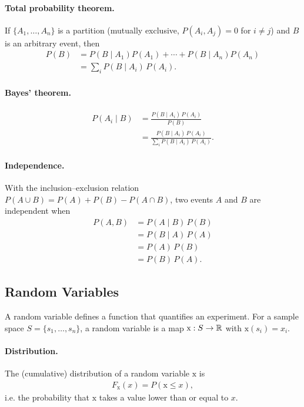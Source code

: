 \paragraph{Total probability theorem.}
If $\{A_1,\dots,A_n\}$ is a partition (mutually exclusive, $P(A_i,A_j)=0$ for $i\neq j$) and $B$ is an arbitrary event, then
\begin{align}
P(B) &= P(B\mid A_1)P(A_1) + \cdots + P(B\mid A_n)P(A_n) \\
&= \sum_{i} P(B\mid A_i)\,P(A_i).
\end{align}

\paragraph{Bayes' theorem.}
\begin{align}
P(A_i\mid B) &= \frac{P(B\mid A_i)\,P(A_i)}{P(B)} \\
&= \frac{P(B\mid A_i)\,P(A_i)}{\sum_{i} P(B\mid A_i)\,P(A_i)}.
\end{align}

\paragraph{Independence.}
With the inclusion--exclusion relation $P(A\cup B) = P(A) + P(B) - P(A\cap B)$, two events $A$ and $B$ are independent when
\begin{align}
P(A,B) &= P(A\mid B)\,P(B) \\
&= P(B\mid A)\,P(A) \\
&= P(A)\,P(B) \\
&= P(B)\,P(A).
\end{align}

\subsection{Random Variables}

A random variable defines a function that quantifies an experiment. For a sample space $S=\{s_1,\dots,s_n\}$, a random variable is a map $\mathrm{x}:S\to\mathbb{R}$ with $\mathrm{x}(s_i)=x_i$.

\paragraph{Distribution.}
The (cumulative) distribution of a random variable $\mathrm{x}$ is
\begin{align}
F_{\mathrm{x}}(x) = P(\mathrm{x}\le x),
\end{align}
i.e. the probability that $\mathrm{x}$ takes a value lower than or equal to $x$.

